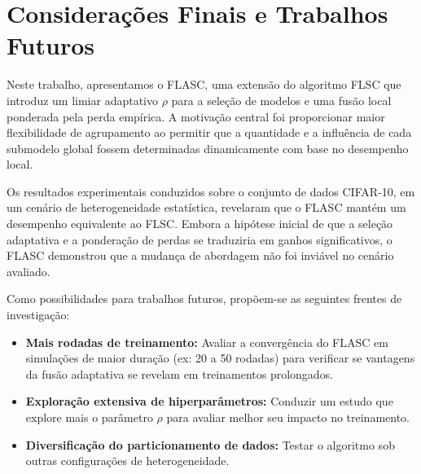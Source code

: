 \section{Considerações Finais e Trabalhos Futuros} \label{sec:conclusion}

Neste trabalho, apresentamos o FLASC,
uma extensão do algoritmo FLSC que introduz um limiar adaptativo $\rho$ para a seleção de modelos e uma fusão local ponderada pela perda empírica.
A motivação central foi proporcionar maior flexibilidade de agrupamento
ao permitir que a quantidade e a influência de cada submodelo global fossem determinadas dinamicamente com base no desempenho local.

Os resultados experimentais conduzidos sobre o conjunto de dados CIFAR-10, em um cenário de heterogeneidade estatística,
revelaram que o FLASC mantém um desempenho equivalente ao FLSC.
Embora a hipótese inicial de que a seleção adaptativa e a ponderação de perdas se traduziria em ganhos significativos,
o FLASC demonstrou que a mudança de abordagem não foi inviável no cenário avaliado.

Como possibilidades para trabalhos futuros, propõem-se as seguintes frentes de investigação:

\begin{itemize}
    \item \textbf{Mais rodadas de treinamento:} Avaliar a convergência do FLASC em simulações de maior duração
    (ex: 20 a 50 rodadas) para verificar se vantagens da fusão adaptativa se revelam em treinamentos prolongados.
    \item \textbf{Exploração extensiva de hiperparâmetros:} Conduzir um estudo que explore mais o parâmetro $\rho$
    para avaliar melhor seu impacto no treinamento.
    \item \textbf{Diversificação do particionamento de dados:} Testar o algoritmo sob outras configurações de heterogeneidade.
\end{itemize}